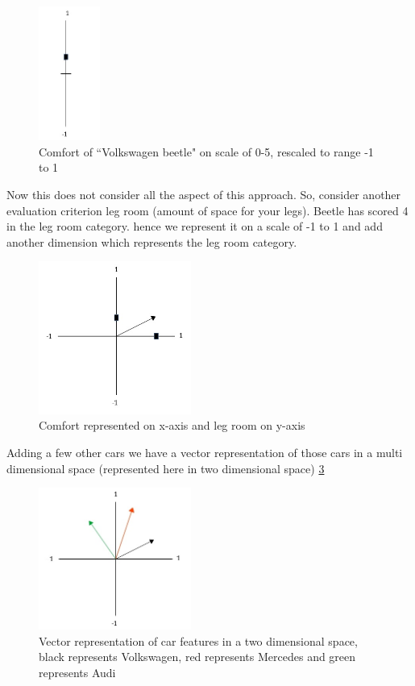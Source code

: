 \begin{figure}[!ht]
    \centering
    \includegraphics[width=2cm]{pics/wordVec.jpg}
    \captionsetup{justification=centering,margin=2cm}
    \caption{Comfort of ``Volkswagen beetle" on scale of 0-5, rescaled to range -1 to 1}
    \label{fig:volkswagan_example}
\end{figure}

Now this does not consider all the aspect of this approach. So, consider another evaluation criterion leg room (amount of space for your legs). Beetle has scored 4 in the leg room category. hence we represent it on a scale of -1 to 1 and add another dimension which represents the leg room category. 

\begin{figure}
    \centering
    \includegraphics[width=5cm]{pics/wordVec_2.jpg}
    \captionsetup{justification=centering,margin=2cm}
    \caption{Comfort represented on x-axis and leg room on y-axis}
    \label{fig:volkswagan_example_2}
\end{figure}

Adding a few other cars we have a vector representation of those cars in a multi dimensional space (represented here in two dimensional space) \ref{fig:wordVecManyCars}


\begin{figure}[!ht]
    \centering
    \includegraphics[width=5cm]{pics/wordVec_2_manycars.jpg}
    \captionsetup{justification=centering,margin=2cm}
    \caption{Vector representation of car features in a two dimensional space, black represents Volkswagen, red represents Mercedes and green represents Audi}
    \label{fig:wordVecManyCars}
\end{figure}



